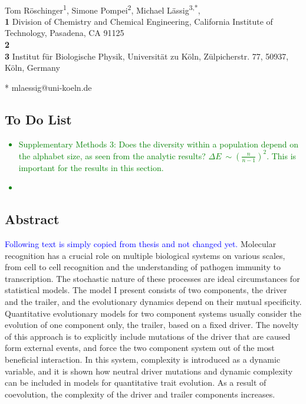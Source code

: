 \documentclass[10pt,a4paper]{article}
\date{}
\begin{document}
	\vspace*{0.2in}

	\begin{flushleft}
		{\Large
			\textbf{}
		}
		\newline
		\\
		Tom R\"oschinger\textsuperscript{1},
		Simone Pompei\textsuperscript{2},
		Michael L\"assig\textsuperscript{3,*},
		\\
		\bigskip
		\textbf{1} Division of Chemistry and Chemical Engineering, California Institute of Technology, Pasadena, CA 91125 \\
		\textbf{2} \\
		\textbf{3} Institut f\"ur Biologische Physik, Universit\"at zu K\"oln,
		Z\"ulpicherstr. 77, 50937, K\"oln, Germany
		\\
		\bigskip


		* mlaessig@uni-koeln.de

	\end{flushleft}
	\subsection*{To Do List}
	\textcolor{green}{
	\begin{itemize}
		\item Supplementary Methods 3: Does the diversity within a population depend on the alphabet size, as seen from the analytic results? $\Delta E ~\sim \left(\frac{n}{n-1}\right)^2$. This is important for the results in this section.
		\item 
	\end{itemize}
	}
	\subsection*{Abstract}
	\textcolor{blue}{Following text is simply copied from thesis and not changed yet.}
	Molecular recognition has a crucial role on multiple biological systems on various scales, from cell to cell recognition and the understanding of pathogen immunity to transcription. The stochastic nature of these processes are ideal circumstances for statistical models. The model I present consists of two components, the driver and the trailer, and the evolutionary dynamics depend on their mutual specificity. Quantitative evolutionary 
	models for two component systems usually consider the evolution of one component only, the trailer, based on a fixed driver. The novelty of this approach
	is to explicitly include mutations of the driver that are caused form external events, and force the two component system out of the most beneficial 
	interaction. In this system, complexity is introduced as a dynamic variable, and it is shown how neutral driver mutations and dynamic complexity can be 
	included in models for quantitative trait evolution. As a result of coevolution, the complexity of the driver and trailer components increases.
\end{document}
